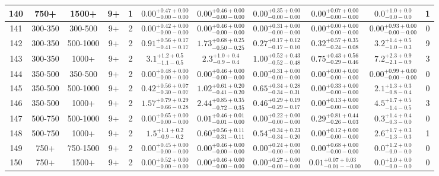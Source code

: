\documentclass[11pt, oneside]{article}
\begin{document}
\begin{table}
{\begin{tabular}{ |c|c|c|c|c||c|c|c|c||c|c| }
140 & 750+ & 1500+ & 9+ & 1 & $0.00^{+0.47+0.00}_{-0.00-0.00}$ & $0.00^{+0.46+0.00}_{-0.00-0.00}$ & $0.00^{+0.35+0.00}_{-0.00-0.00}$ & $0.00^{+0.07+0.00}_{-0.00-0.00}$ & $0.0^{+1.0+0.0}_{-0.0-0.0}$ & 1 \\ \hline
141 & 300-350 & 300-500 & 9+ & 2 & $0.00^{+0.42+0.00}_{-0.00-0.00}$ & $0.00^{+0.46+0.00}_{-0.00-0.00}$ & $0.00^{+0.31+0.00}_{-0.00-0.00}$ & $0.00^{+0.00+0.00}_{-0.00-0.00}$ & $0.00^{+0.93+0.00}_{-0.00-0.00}$ & 0 \\ \hline
142 & 300-350 & 500-1000 & 9+ & 2 & $0.91^{+0.56+0.17}_{-0.41-0.17}$ & $1.73^{+0.68+0.25}_{-0.50-0.25}$ & $0.27^{+0.17+0.12}_{-0.17-0.10}$ & $0.32^{+0.57+0.35}_{-0.24-0.08}$ & $3.2^{+1.4+0.5}_{-1.0-0.3}$ & 9 \\ \hline
143 & 300-350 & 1000+ & 9+ & 2 & $3.1^{+1.2+0.5}_{-1.1-0.5}$ & $2.3^{+1.0+0.4}_{-0.9-0.4}$ & $1.00^{+0.52+0.43}_{-0.52-0.48}$ & $0.75^{+0.43+0.56}_{-0.29-0.46}$ & $7.2^{+2.3+0.9}_{-2.1-0.9}$ & 3 \\ \hline
144 & 350-500 & 350-500 & 9+ & 2 & $0.00^{+0.48+0.00}_{-0.00-0.00}$ & $0.00^{+0.46+0.00}_{-0.00-0.00}$ & $0.00^{+0.31+0.00}_{-0.00-0.00}$ & $0.00^{+0.00+0.00}_{-0.00-0.00}$ & $0.00^{+0.99+0.00}_{-0.00-0.00}$ & 0 \\ \hline
145 & 350-500 & 500-1000 & 9+ & 2 & $0.42^{+0.56+0.07}_{-0.30-0.07}$ & $1.02^{+0.61+0.20}_{-0.41-0.20}$ & $0.65^{+0.34+0.28}_{-0.34-0.31}$ & $0.00^{+0.33+0.00}_{-0.00-0.00}$ & $2.1^{+1.3+0.3}_{-0.8-0.4}$ & 0 \\ \hline
146 & 350-500 & 1000+ & 9+ & 2 & $1.57^{+0.79+0.29}_{-0.66-0.28}$ & $2.44^{+0.85+0.35}_{-0.72-0.35}$ & $0.46^{+0.29+0.19}_{-0.29-0.17}$ & $0.00^{+0.13+0.00}_{-0.00-0.00}$ & $4.5^{+1.7+0.5}_{-1.4-0.5}$ & 3 \\ \hline
147 & 500-750 & 500-1000 & 9+ & 2 & $0.00^{+0.65+0.00}_{-0.00-0.00}$ & $0.01^{+0.46+0.01}_{-0.01-0.00}$ & $0.00^{+0.22+0.00}_{-0.00-0.00}$ & $0.29^{+0.81+0.44}_{-0.26-0.03}$ & $0.3^{+1.4+0.4}_{-0.3-0.0}$ & 0 \\ \hline
148 & 500-750 & 1000+ & 9+ & 2 & $1.5^{+1.1+0.2}_{-0.9-0.2}$ & $0.60^{+0.56+0.11}_{-0.31-0.11}$ & $0.54^{+0.34+0.23}_{-0.34-0.20}$ & $0.00^{+0.12+0.00}_{-0.00-0.00}$ & $2.6^{+1.7+0.3}_{-1.3-0.3}$ & 1 \\ \hline
149 & 750+ & 750-1500 & 9+ & 2 & $0.00^{+0.45+0.00}_{-0.00-0.00}$ & $0.00^{+0.46+0.00}_{-0.00-0.00}$ & $0.00^{+0.24+0.00}_{-0.00-0.00}$ & $0.00^{+0.68+0.00}_{-0.00-0.00}$ & $0.0^{+1.2+0.0}_{-0.0-0.0}$ & 0 \\ \hline
150 & 750+ & 1500+ & 9+ & 2 & $0.00^{+0.52+0.00}_{-0.00-0.00}$ & $0.00^{+0.46+0.00}_{-0.00-0.00}$ & $0.00^{+0.27+0.00}_{-0.00-0.00}$ & $0.01^{+0.07+0.03}_{-0.01--0.00}$ & $0.0^{+1.0+0.0}_{-0.0-0.0}$ & 0 \\ \hline

\end{tabular}}
\end{table}
\end{document}
